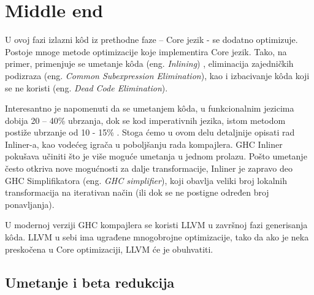 \section{Middle end}
\label{sec:middle}

U ovoj fazi izlazni k\^{o}d iz prethodne faze – Core jezik - se dodatno optimizuje. Postoje mnoge metode optimizacije koje implementira Core jezik. Tako, na primer, primenjuje se umetanje k\^{o}da (eng. \emph{Inlining}) \cite{inliner}, eliminacija zajedničkih podizraza (eng. \emph{Common Subexpression Elimination}), kao i izbacivanje k\^{o}da koji se ne koristi (eng. \emph{Dead Code Elimination}).

Interesantno je napomenuti da se umetanjem k\^{o}da, u funkcionalnim jezicima dobija 20 – 40\% ubrzanja, dok se kod imperativnih jezika, istom metodom postiže ubrzanje od 10 - 15\% \cite{Cinliner}. Stoga ćemo u ovom delu detaljnije opisati rad Inliner-a, kao vodećeg igrača u poboljšanju rada kompajlera. GHC Inliner pokušava učiniti što je više moguće umetanja u jednom prolazu. Pošto umetanje često otkriva nove mogućnosti za dalje transformacije, Inliner je zapravo deo GHC Simplifikatora (eng. \emph{GHC simplifier}), koji obavlja veliki broj lokalnih transformacija na iterativan način (ili dok se ne postigne određen broj ponavljanja).

U modernoj verziji GHC kompajlera se koristi LLVM u završnoj fazi generisanja k\^{o}da. LLVM u sebi ima ugrađene mnogobrojne optimizacije, tako da ako je neka preskočena u Core optimizaciji, LLVM će je obuhvatiti.

\subsection{Umetanje i beta redukcija}
\label{subsec:podnaslovInlineBeta}

